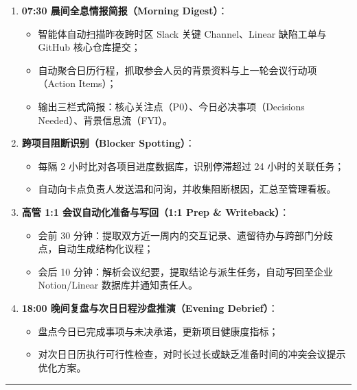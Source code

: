 \documentclass[10.5pt,a4paper,oneside]{report}
\providecommand{\tightlist}{\setlength{\itemsep}{0pt}\setlength{\parskip}{0pt}}
\begin{document}
\begin{enumerate}
\def\labelenumi{\arabic{enumi}.}
\tightlist
\item
  \textbf{07:30 晨间全息情报简报（Morning Digest）}：

  \begin{itemize}
  \tightlist
  \item
    智能体自动扫描昨夜跨时区 Slack 关键 Channel、Linear 缺陷工单与
    GitHub 核心仓库提交；
  \item
    自动聚合日历行程，抓取参会人员的背景资料与上一轮会议行动项（Action
    Items）；
  \item
    输出三栏式简报：核心关注点（P0）、今日必决事项（Decisions
    Needed）、背景信息流（FYI）。
  \end{itemize}
\item
  \textbf{跨项目阻断识别（Blocker Spotting）}：

  \begin{itemize}
  \tightlist
  \item
    每隔 2 小时比对各项目进度数据库，识别停滞超过 24 小时的关联任务；
  \item
    自动向卡点负责人发送温和问询，并收集阻断根因，汇总至管理看板。
  \end{itemize}
\item
  \textbf{高管 1:1 会议自动化准备与写回（1:1 Prep \& Writeback）}：

  \begin{itemize}
  \tightlist
  \item
    会前 30
    分钟：提取双方近一周内的交互记录、遗留待办与跨部门分歧点，自动生成结构化议程；
  \item
    会后 10 分钟：解析会议纪要，提取结论与派生任务，自动写回至企业
    Notion/Linear 数据库并通知责任人。
  \end{itemize}
\item
  \textbf{18:00 晚间复盘与次日日程沙盘推演（Evening Debrief）}：

  \begin{itemize}
  \tightlist
  \item
    盘点今日已完成事项与未决承诺，更新项目健康度指标；
  \item
    对次日日历执行可行性检查，对时长过长或缺乏准备时间的冲突会议提示优化方案。
  \end{itemize}
\end{enumerate}

\begin{center}\rule{0.5\linewidth}{0.5pt}\end{center}
\end{document}
